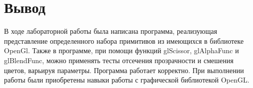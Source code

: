 \section*{Вывод}
В ходе лабораторной работы была написана программа, реализующая представление определенного набора примитивов из имеющихся в библиотеке OpenGl.
Также в программе, при помощи функций glScissor, glAlphaFunc и glBlendFunc, можно применять тесты отсечения прозрачности и смешения цветов, варьируя параметры.
Программа работает корректно.
При выполнении работы были приобретены навыки работы с графической библиотекой OpenGL.